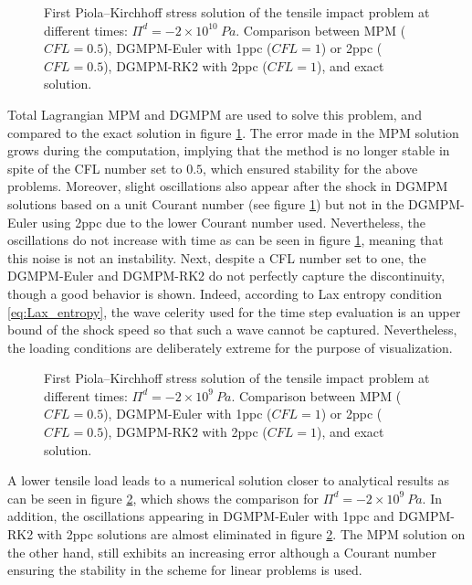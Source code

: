\begin{figure}[h!]
  \centering
  { \label{subfig:he_shock1}}
  { \label{subfig:he_shock2}}
  {}
  \caption{First Piola–Kirchhoff stress solution of the tensile impact problem at different times: $\Pi^d=-2\times 10^{10} \: Pa$. Comparison between MPM ($CFL=0.5$), DGMPM-Euler with 1ppc ($CFL=1$) or 2ppc ($CFL=0.5$), DGMPM-RK2 with 2ppc ($CFL=1$), and exact solution.}
  \label{fig:he_shock}
\end{figure}
Total Lagrangian MPM and DGMPM are used to solve this problem, and compared to the exact solution in figure \ref{fig:he_shock}.
The error made in the MPM solution grows during the computation, implying that the method is no longer stable in spite of the CFL number set to $0.5$, which ensured stability for the above problems.
Moreover, slight oscillations also appear after the shock in DGMPM solutions based on a unit Courant number (see figure \ref{fig:he_shock}) but not in the DGMPM-Euler using 2ppc due to the lower Courant number used.
Nevertheless, the oscillations do not increase with time as can be seen in figure \ref{fig:he_shock}, meaning that this noise is not an instability.
Next, despite a CFL number set to one, the DGMPM-Euler and DGMPM-RK2 do not perfectly capture the discontinuity, though a good behavior is shown.
Indeed, according to Lax entropy condition \eqref{eq:Lax_entropy}, the wave celerity used for the time step evaluation is an upper bound of the shock speed so that such a wave cannot be captured.
Nevertheless, the loading conditions are deliberately extreme for the purpose of visualization.
\begin{figure}[h!]
  \centering
  { \label{subfig:he_low_shock1}}
  { \label{subfig:he_low_shock2}}
  {}
  \caption{First Piola–Kirchhoff stress solution of the tensile impact problem at different times: $\Pi^d=-2\times 10^{9} \: Pa$. Comparison between MPM ($CFL=0.5$), DGMPM-Euler with 1ppc ($CFL=1$) or 2ppc ($CFL=0.5$), DGMPM-RK2 with 2ppc ($CFL=1$), and exact solution.}
  \label{fig:he_low_shock}
\end{figure}

A lower tensile load leads to a numerical solution closer to analytical results as can be seen in figure \ref{fig:he_low_shock}, which shows the comparison for $\Pi^d=-2\times 10^{9} \: Pa$.
In addition, the oscillations appearing in DGMPM-Euler with 1ppc and DGMPM-RK2 with 2ppc solutions are almost eliminated in figure \ref{fig:he_low_shock}.
The MPM solution on the other hand, still exhibits an increasing error although a Courant number ensuring the stability in the scheme for linear problems is used.


